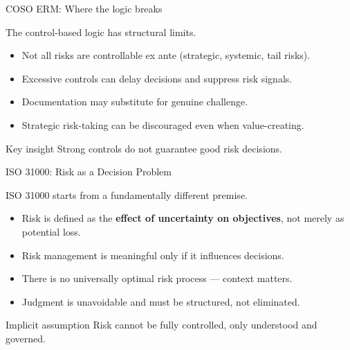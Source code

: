 \documentclass[aspectratio=169, 10pt]{beamer} %
\begin{document}
\begin{frame}{COSO ERM: Where the logic breaks}

The control-based logic has structural limits.

\medskip

\begin{itemize}
    \item Not all risks are controllable ex ante (strategic, systemic, tail risks).
    
    \item Excessive controls can delay decisions and suppress risk signals.
    
    \item Documentation may substitute for genuine challenge.
    
    \item Strategic risk-taking can be discouraged even when value-creating.
\end{itemize}

\begin{block}{Key insight}
Strong controls do not guarantee good risk decisions.
\end{block}

\end{frame}

\begin{frame}{ISO 31000: Risk as a Decision Problem}

ISO 31000 starts from a fundamentally different premise.

\medskip

\begin{itemize}
    \item Risk is defined as the \textbf{effect of uncertainty on objectives},
    not merely as potential loss.
    
    \item Risk management is meaningful only if it influences decisions.
    
    \item There is no universally optimal risk process — context matters.
    
    \item Judgment is unavoidable and must be structured, not eliminated.
\end{itemize}

\begin{block}{Implicit assumption}
Risk cannot be fully controlled, only understood and governed.
\end{block}

\end{frame}
\end{document}
